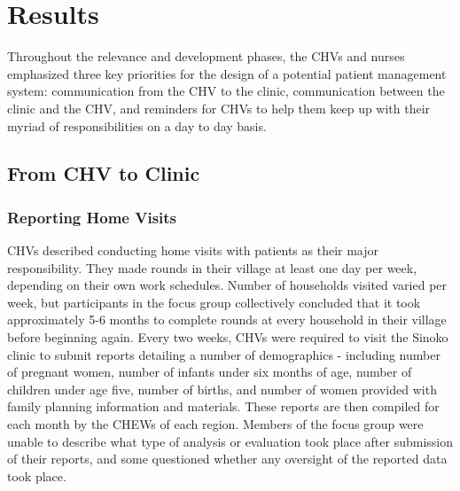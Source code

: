 \section{Results}
Throughout the relevance and development phases, the CHVs and nurses emphasized three key priorities for the design of a potential patient management system: communication from the CHV to the clinic, communication between the clinic and the CHV, and reminders for CHVs to help them keep up with their myriad of responsibilities on a day to day basis. 

\subsection{From CHV to Clinic}
\subsubsection{Reporting Home Visits}
CHVs described conducting home visits with patients as their major responsibility. They made rounds in their village at least one day per week, depending on their own work schedules. Number of households visited varied per week, but participants in the focus group collectively concluded that it took approximately 5-6 months to complete rounds at every household in their village before beginning again. Every two weeks, CHVs were required to visit the Sinoko clinic to submit reports detailing a number of demographics - including number of pregnant women, number of infants under six months of age, number of children under age five, number of births, and number of women provided with family planning information and materials. These reports are then compiled for each month by the CHEWs of each region.  Members of the focus group were unable to describe what type of analysis or evaluation took place after submission of their reports, and some questioned whether any oversight of the reported data took place. 

